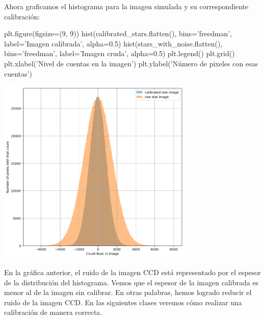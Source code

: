 Ahora graficamos el histograma para la imagen simulada y su correspondiente calibración:

\begin{pyin}
plt.figure(figsize=(9, 9))
hist(calibrated_stars.flatten(), bins='freedman', label='Imagen calibrada', alpha=0.5)
hist(stars_with_noise.flatten(), bins='freedman', label='Imagen cruda', alpha=0.5)
plt.legend()
plt.grid()
plt.xlabel('Nivel de cuentas en la imagen')
plt.ylabel('Número de pixeles con esas cuentas') 
\end{pyin}

\noindent
\includegraphics[width=0.7\textwidth]{figures/counts_hist_simulated.png}

En la gráfica anterior, el ruido de la imagen CCD está representado por el espesor de la distribución del histograma. Vemos que el espesor de la imagen calibrada es menor al de la imagen sin calibrar. En otras palabras, hemos logrado reducir el ruido de la imagen CCD. En las siguientes clases veremos cómo realizar una calibración de manera correcta. 
